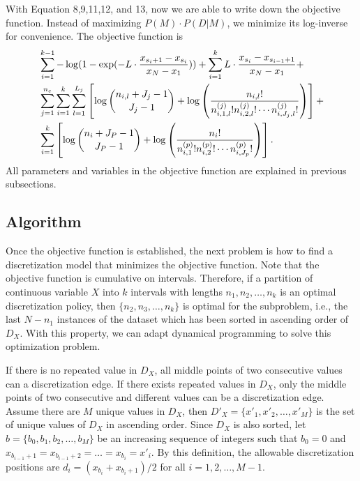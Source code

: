 With Equation 8,9,11,12, and 13, now we are able to write down the objective function. Instead of maximizing $P(M) \cdot P(D|M)$, we minimize its log-inverse for convenience. The objective function is
\begin{equation}
\begin{aligned}
& \sum_{i=1}^{k-1} - \log(1 - {\exp(- L \cdot {{x_{s_i+1} - x_{s_i}}\over{x_N - x_1}})}) +  \sum_{i=1}^{k} L \cdot {{x_{s_{i}} - x_{s_{i-1} + 1}}\over{x_N - x_1}} +\\
&  \sum_{j=1}^{n_c} \sum_{i=1}^{k}  \sum_{l=1}^{L_j} \left[  \log{{n_{i,l} + J_j - 1}\choose{J_j-1}} + \log \left( { {{n_{i,l}}!}\over{ {n^{(j)}_{i,1,l} !} {n^{(j)}_{i,2,l} !} \cdots {n^{(j)}_{i,J_j,l} !}} } \right) \right] + \\
& \sum_{i=1}^k \left[  \log {{n_{i} + J_P - 1}\choose{J_P-1}} + \log \left( { {{n_i}!}\over{ {n^{(p)}_{i,1} !} {n^{(p)}_{i,2} !} \cdots {n^{(p)}_{i,J_p} !}} } \right) \right].
\end{aligned}
\end{equation}
All parameters and variables in the objective function are explained in previous subsections.
\subsection{Algorithm}
\label{algo}
Once the objective function is established, the next problem is how to find a discretization model that minimizes the objective function. Note that the objective function is cumulative on intervals. Therefore, if a partition of continuous variable $X$ into $k$ intervals with lengths $n_1,n_2,\ldots,n_k$ is an optimal discretization policy, then $\{ n_2, n_3,\ldots,n_k \}$ is optimal for the subproblem, i.e., the last $N - n_1$ instances of the dataset which has been sorted in ascending order of $D_X$. With this property, we can adapt dynamical programming to solve this optimization problem.

If there is no repeated value in $D_X$, all middle points of two consecutive values can a discretization edge. If there exists repeated values in $D_X$, only the middle points of two consecutive and different values can be a discretization edge. Assume there are $M$ unique values in $D_X$, then ${D'_X} = \{ x'_1,x'_2,\ldots,x'_M \}$ is the set of unique values of $D_X$ in ascending order. Since $D_X$ is also sorted, let $b = \{ b_0,b_1,b_2,\ldots,b_M \}$ be an increasing sequence of integers such that $b_0 = 0$ and $x_{b_{i-1} + 1} = x_{b_{i-1} + 2} = \ldots = x_{{b_i}} = x'_i$. By this definition, the allowable discretization positions are $d_i = ( x_{b_{i}} + x_{{b_i}+1})/2$ for all $i = 1,2,\ldots,M-1$.

